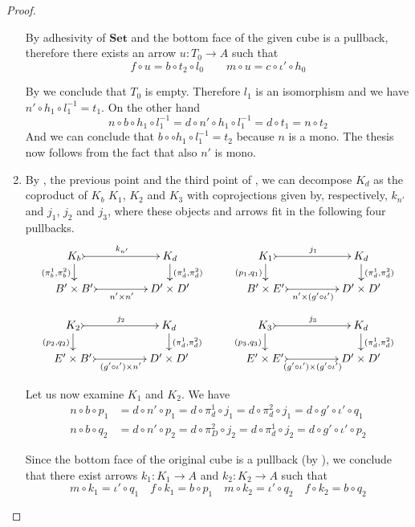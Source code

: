\documentclass[a4paper,UKenglish,cleveref,pdftex,thm-restate,numberwithinsect]{lipics-v2021}
\newcommand{\Set}{\mathbf{Set}}
\begin{document}
\begin{proof}
\begin{enumerate}
		By adhesivity of $\Set$ and  the bottom face of the given cube is a pullback, therefore there exists an arrow $u\colon T_0\to A$ such that 
		\[f\circ u=b\circ t_2\circ l_0 \qquad m\circ u=c\circ \iota'\circ h_0\]
		
	By  we conclude that $T_0$ is empty. Therefore $l_1$ is an isomorphism and we have $n'\circ h_1\circ l^{-1}_1=t_1$. On the other hand
\[n\circ b\circ h_1\circ l^{-1}_1=d\circ n'\circ h_1\circ l^{-1}_1=d\circ t_1=n\circ t_2\]
And we can conclude that $b\circ \circ h_1\circ l^{-1}_1=t_2$ because $n$ is a mono. The thesis now follows from the fact that  also $n'$ is mono.
		
		\item 	 By , the previous point and the third point of , we can decompose $K_d$ as the coproduct of $K_b$ $K_1$, $K_2$ and $K_3$ with coprojections given by, respectively, $k_{n'}$ and $j_1$, $j_2$ and $j_3$, where these objects and arrows fit in the following four pullbacks.
		\[\xymatrix@C=45pt@R=15pt{K_b \ar@{>->}[r]^{k_{n'}}  \ar[d]_{(\pi^1_b, \pi^2_b)}& K_d   \ar[d]^{(\pi^1_d, \pi^2_d)}& K_1 \ar@{>->}[r]^{j_1}  \ar[d]_{(p_1, q_1)} & K_d \ar[d]^{(\pi^1_d, \pi^2_d)} \\
			B'\times B' \ar@{>->}[r]_-{n'\times n'} & D'\times D' & B'\times E' \ar@{>->}[r]_-{n'\times (g'\circ \iota')} & D'\times D'}\]
		\[ \xymatrix@C=45pt@R=15pt{K_2 \ar@{>->}[r]^{j_2}  \ar[d]_{(p_2, q_2)}& K_d   \ar[d]^{(\pi^1_d, \pi^2_d)}& K_3 \ar@{>->}[r]^{j_3}  \ar[d]_{(p_3, q_3)} & K_d \ar[d]^{(\pi^1_d, \pi^2_d)} \\
			E'\times B' \ar@{>->}[r]_-{(g'\circ \iota') \times n'} & D'\times D' & E'\times E' \ar@{>->}[r]_-{(g'\circ \iota')\times (g'\circ \iota')} & D'\times D'}\]

Let us now examine $K_1$ and $K_2$. We have
\begin{align*}
	n\circ b\circ p_1&=d\circ n'\circ p_1=d\circ \pi^1_d\circ j_1=d\circ \pi^2_d\circ j_1=d\circ g'\circ \iota'\circ q_1\\
	n\circ b\circ q_2 &=d\circ n'\circ p_2=d\circ\pi^2_D\circ j_2
	=d\circ \pi^1_d\circ j_2=d\circ g'\circ \iota'\circ p_2
\end{align*}

Since the bottom face of the original cube is a pullback (by ), we conclude that there exist arrows $k_1\colon  K_1\to A$ and $k_2\colon K_2\to A$ such that
\[m\circ k_1=\iota'\circ q_1 \quad f\circ k_1=b\circ p_1 \quad m\circ k_2=\iota'\circ q_2 \quad f\circ k_2=b\circ q_2\]


\end{enumerate}
\end{proof}
\end{document}
